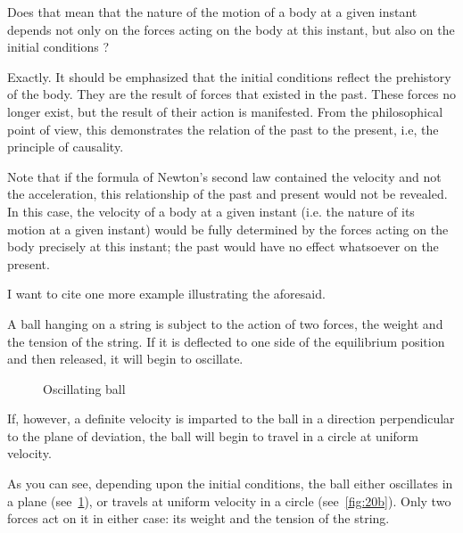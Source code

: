 \begin{s}
Does that mean that the nature of the motion of a body at a given instant depends not only on the forces acting on the body at this instant, but also on the initial conditions ?
\end{s}


\begin{p}
Exactly. It should be emphasized that the initial conditions reflect the prehistory of the body. They are the result of forces that existed in the past. These forces no longer exist, but the result of their action is manifested. From the philosophical point of view, this demonstrates the relation of the past to the present, i.e, the principle of causality.

Note that if the formula of Newton's second law contained the velocity and not the acceleration, this relationship of the past and present would not be revealed. In this case, the velocity of a body at a given instant (i.e. the nature of its motion at a given instant) would be fully determined by the forces acting on the body precisely at this instant; the past would have no effect whatsoever on the present.

I want to cite one more example illustrating the aforesaid. 

A ball hanging on a string is subject to the action of two forces, the weight and the tension of the string. If it is deflected to one side of the equilibrium position and then released, it will begin to oscillate. 

\begin{figure}[H]
\centering
{}

\caption{Oscillating ball}
\label{fig:20a}
\end{figure}

If, however, a definite velocity is imparted to the ball in a direction perpendicular to the plane of deviation, the ball will begin to travel in a circle at uniform velocity. 


As you can see, depending upon the initial conditions, the ball either oscillates in a plane (see~\cref{fig:20a}), or travels at uniform velocity in a circle (see~\cref{fig:20b}). Only two forces act on it in either case: its weight and the tension of the string.
\end{p}



